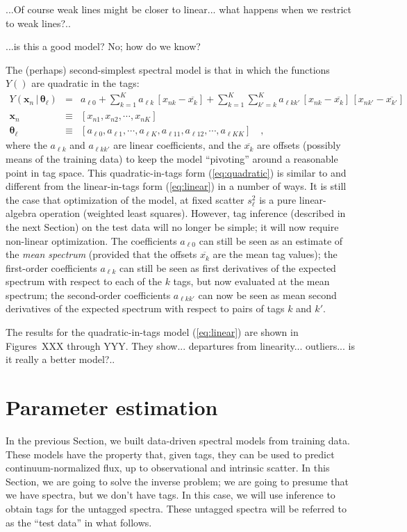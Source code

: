 \documentclass[12pt, preprint]{aastex}
\newcommand{\sectionname}{Section}
\newcommand{\set}[1]{\bm{#1}}
\newcommand{\mean}[1]{\overline{#1}}
\newcommand{\given}{\,|\,}
\begin{document}
...Of course weak lines might be closer to linear... what happens when
we restrict to weak lines?..

...is this a good model?  No; how do we know?

The (perhaps) second-simplest spectral model is that in which the
functions $Y()$ are quadratic in the tags:
\begin{eqnarray}
Y(\set{x}_n\given\set{\theta}_\ell) &=&
 a_{\ell 0} + \sum_{k=1}^K a_{\ell k}\,[x_{nk} - \mean{x_k}]
 + \sum_{k=1}^K \sum_{k'=k}^K a_{\ell kk'}\,[x_{nk} - \mean{x_k}]\,[x_{nk'} - \mean{x_{k'}}]
\label{eq:quadratic}\\
\set{x}_n &\equiv& [x_{n1}, x_{n2}, \cdots, x_{nK}]
\\
\set{\theta}_\ell &\equiv& [a_{\ell 0}, a_{\ell 1}, \cdots, a_{\ell K},
                            a_{\ell 11}, a_{\ell 12}, \cdots, a_{\ell KK}]
\quad ,
\end{eqnarray}
where the $a_{\ell k}$ and $a_{\ell kk'}$ are linear coefficients, and
the $\mean{x_k}$ are offsets (possibly means of the training data) to
keep the model ``pivoting'' around a reasonable point in tag space.
This quadratic-in-tags form (\ref{eq:quadratic}) is similar to and
different from the linear-in-tags form (\ref{eq:linear}) in a number
of ways.
It is still the case that optimization of the model, at fixed scatter
$s_\ell^2$ is a pure linear-algebra operation (weighted least
squares).
However, tag inference (described in the next Section) on the test
data will no longer be simple; it will now require non-linear
optimization.
The coefficients $a_{\ell 0}$ can still be seen as an estimate of the
\emph{mean spectrum} (provided that the offsets $\mean{x_k}$ are the
mean tag values); the first-order coefficients $a_{\ell k}$ can still
be seen as first derivatives of the expected spectrum with respect to
each of the $k$ tags, but now evaluated at the mean spectrum; the
second-order coefficients $a_{\ell kk'}$ can now be seen as mean
second derivatives of the expected spectrum with respect to pairs of
tags $k$ and $k'$.

The results for the quadratic-in-tags model (\ref{eq:linear}) are shown
in Figures~XXX through YYY.  They show... departures from
linearity... outliers... is it really a better model?..

\section{Parameter estimation}

In the previous \sectionname, we built data-driven spectral models
from training data.
These models have the property that, given tags, they can be used to
predict continuum-normalized flux, up to observational and intrinsic
scatter.
In this \sectionname, we are going to solve the inverse problem; we
are going to presume that we have spectra, but we don't have tags.
In this case, we will use inference to obtain tags for the untagged
spectra.
These untagged spectra will be referred to as the ``test data'' in
what follows.
\end{document}
